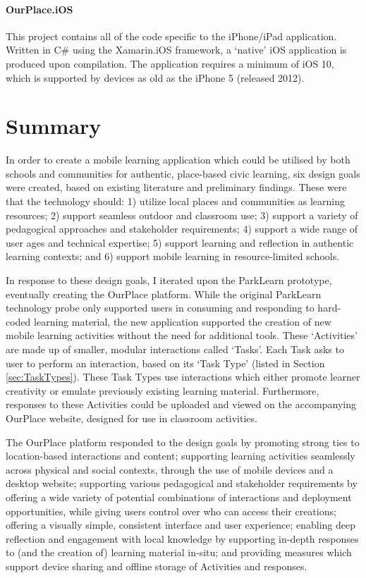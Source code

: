 \paragraph{OurPlace.iOS}
This project contains all of the code specific to the iPhone/iPad application. Written in C\# using the Xamarin.iOS framework, a `native' iOS application is produced upon compilation. The application requires a minimum of iOS 10, which is supported by devices as old as the iPhone 5 (released 2012).

\section{Summary}
In order to create a mobile learning application which could be utilised by both schools and communities for authentic, place-based civic learning, six design goals were created, based on existing literature and preliminary findings. These were that the technology should: 1) utilize local places and communities as learning resources; 2) support seamless outdoor and classroom use; 3) support a variety of pedagogical approaches and stakeholder requirements; 4) support a wide range of user ages and technical expertise; 5) support learning and reflection in authentic learning contexts; and 6) support mobile learning in resource-limited schools.

In response to these design goals, I iterated upon the ParkLearn prototype, eventually creating the OurPlace platform. While the original ParkLearn technology probe only supported users in consuming and responding to hard-coded learning material, the new application supported the creation of new mobile learning activities without the need for additional tools. These `Activities' are made up of smaller, modular interactions called `Tasks'. Each Task asks to user to perform an interaction, based on its `Task Type' (listed in Section \ref{sec:TaskTypes}). These Task Types use interactions which either promote learner creativity or emulate previously existing learning material. Furthermore, responses to these Activities could be uploaded and viewed on the accompanying OurPlace website, designed for use in classroom activities. 

The OurPlace platform responded to the design goals by promoting strong ties to location-based interactions and content; supporting learning activities seamlessly across physical and social contexts, through the use of mobile devices and a desktop website; supporting various pedagogical and stakeholder requirements by offering a wide variety of potential combinations of interactions and deployment opportunities, while giving users control over who can access their creations; offering a visually simple, consistent interface and user experience; enabling deep reflection and engagement with local knowledge by supporting in-depth responses to (and the creation of) learning material in-situ; and providing measures which support device sharing and offline storage of Activities and responses.